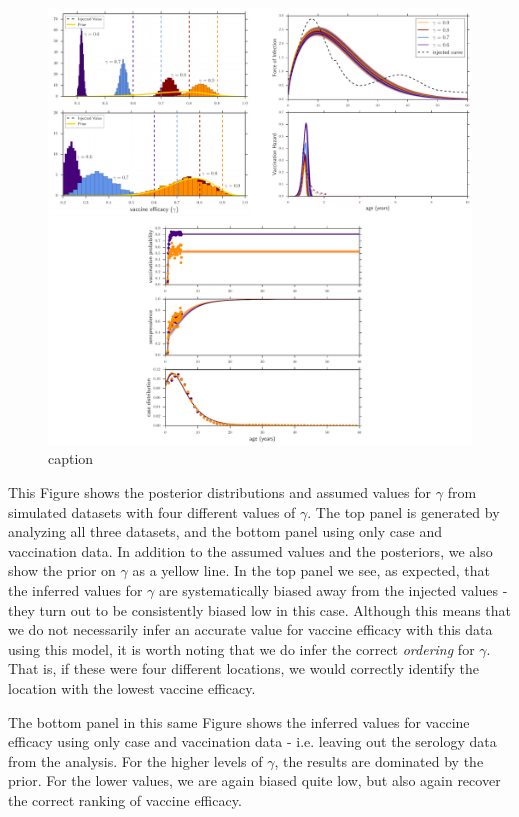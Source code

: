 \documentclass[nofootinbib,aps,pre,twocolumn,superscriptaddress,showkeys,showpacs]{revtex4-1}
\begin{document}
\begin{figure}
\includegraphics[width=\textwidth,angle=0]{figures/SimPlots-crop.pdf}
\caption{caption\label{fig:simplots}}
\end{figure}


This Figure shows the posterior distributions and assumed values for $\gamma$ from simulated datasets with four different values of $\gamma$. The top panel is generated by analyzing all three datasets, and the bottom panel using only case and vaccination data. In addition to the assumed values and the posteriors, we also show the prior on $\gamma$ as a yellow line. In the top panel we see, as expected, that the inferred values for $\gamma$ are systematically biased away from the injected values - they turn out to be consistently biased low in this case. Although this means that we do not necessarily infer an accurate value for vaccine efficacy with this data using this model, it is worth noting that we do infer the correct \emph{ordering} for $\gamma$. That is, if these were four different locations, we would correctly identify the location with the lowest vaccine efficacy.

The bottom panel in this same Figure shows the inferred values for vaccine efficacy using only case and vaccination data - i.e. leaving out the serology data from the analysis. For the higher levels of $\gamma$, the results are dominated by the prior. For the lower values, we are again biased quite low, but also again recover the correct ranking of vaccine efficacy.
\end{document}
